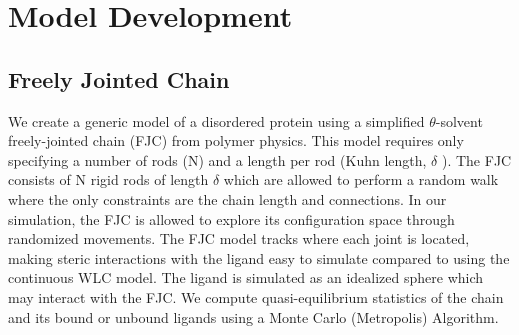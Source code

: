 \documentclass[../AdvancementSummary.tex]{subfiles}
\begin{document}
\section{Model Development}
\label{sec:ModelDev}

\subsection{Freely Jointed Chain}

We create a generic model of a disordered protein using a simplified $\theta$-solvent freely-jointed chain (FJC) from polymer physics. This model requires only specifying a number of rods (N) and a length per rod (Kuhn length, $\delta$ ).  The FJC consists of N rigid rods of length $\delta$ which are allowed to perform a random walk where the only constraints are the chain length and connections. In our simulation, the FJC is allowed to explore its configuration space through randomized movements.  The FJC model tracks where each joint is located, making steric interactions with the ligand easy to simulate compared to using the continuous WLC model.  The ligand is simulated as an idealized sphere which may interact with the FJC. We compute quasi-equilibrium statistics of the chain and its bound or unbound ligands using a Monte Carlo (Metropolis) Algorithm. 
\end{document}
